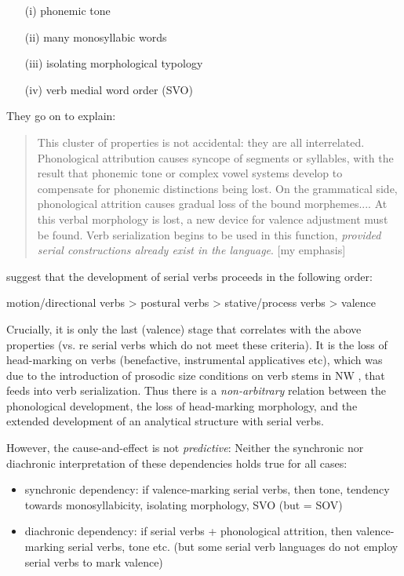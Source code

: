 \documentclass[output=paper]{langsci/langscibook}
\begin{document}
\begin{itemize}
 \item [(i)]  phonemic tone  
 \item [(ii)]  many monosyllabic words   
 \item [(iii)]  isolating morphological typology 
 \item [(iv)]  verb medial word order (SVO)
\end{itemize}


They go on to explain:
\begin{quote}
This cluster of properties is not accidental: they are all interrelated. Phonological attribution causes syncope of segments or syllables, with the result that phonemic tone or complex vowel systems develop to compensate for phonemic distinctions being lost. On the grammatical side, phonological attrition causes gradual loss of the bound morphemes.... At this verbal morphology is lost, a new device for valence adjustment must be found. Verb serialization begins to be used in this function, \textit{provided serial constructions already exist in the language}. \citep[51]{Foley1985} [my emphasis]
\end{quote}


 \citeauthor{Foley1985} suggest that the development of serial verbs proceeds in the following order:

\ea  motion/directional verbs {\textgreater} postural verbs {\textgreater} stative/process verbs {\textgreater} valence
\z

Crucially, it is only the last (valence) stage that correlates with the above properties (vs. \citeauthor{Crowley2002} \citeyear{Crowley2002} re  serial verbs which do not meet these criteria). It is the loss of head-marking on verbs (benefactive, instrumental applicatives etc), which was due to the introduction of prosodic size conditions on verb stems in NW  \citep{Hyman2004}, that feeds into verb serialization. Thus there is a \textit{non-arbitrary} relation between the phonological development, the loss of head-marking morphology, and the extended development of an analytical structure with serial verbs.

    However, the cause-and-effect is not \textit{predictive}: Neither the synchronic nor diachronic interpretation of these dependencies holds true for all cases:

\begin{itemize}
  \item synchronic dependency:  if valence-marking serial verbs, then tone, tendency towards monosyllabicity, isolating morphology, SVO (but  = SOV)

  \item   diachronic dependency:  if serial verbs + phonological attrition, then valence-marking serial verbs, tone etc. (but some serial verb languages do not employ serial verbs to mark valence)

\end{itemize}
\end{document}
